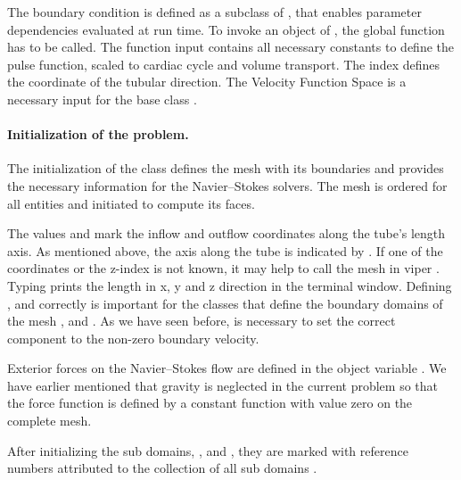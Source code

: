 The boundary condition  is defined as a subclass of , that enables parameter dependencies evaluated at run time. To invoke an object of , the global function  has to be called. The function input contains all necessary constants to define the pulse function, scaled to cardiac cycle and volume transport. The index  defines the coordinate of the tubular direction. The Velocity Function Space  is a necessary input for the base class . 




\paragraph{Initialization of the problem.} The initialization of the class  defines the mesh with its boundaries and provides the necessary information for the Navier--Stokes solvers. The mesh is ordered for all entities and initiated to compute its faces.


The values  and  mark the inflow and outflow coordinates along the tube's length axis. As mentioned above, the axis along the tube is indicated by . If one of the coordinates or the z-index is not known, it may help to call the mesh in viper . Typing  prints the length in x, y and z direction in the terminal window. Defining ,  and  correctly is important for the classes that define the boundary domains of the mesh ,  and . As we have seen before,  is necessary to set the correct component to the non-zero boundary velocity. 

Exterior forces on the Navier--Stokes flow are defined in the object variable . We have earlier mentioned that gravity is neglected in the current problem so that the force function  is defined by a constant function  with value zero on the complete mesh.

After initializing the sub domains, ,  and , they are marked with reference numbers attributed to the collection of all sub domains . 

